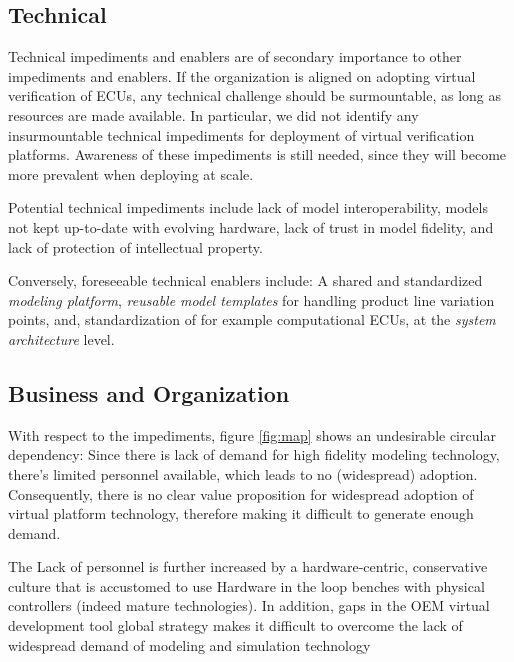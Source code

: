 \subsection{Technical}
Technical impediments and enablers are of secondary importance to other impediments and enablers.
If the organization is aligned on adopting virtual verification of ECUs,
any technical challenge should be surmountable, as long as resources are made available.
In particular, we did not identify any insurmountable technical impediments for deployment of virtual verification platforms.
Awareness of these impediments is still needed, since they will become more prevalent when deploying at scale.

Potential technical impediments include
lack of model interoperability,
models not kept up-to-date with evolving hardware,
lack of trust in model fidelity,
and lack of protection of intellectual property.

Conversely, foreseeable technical enablers include:
A shared and standardized \emph{modeling platform},
\emph{reusable model templates} for handling product line variation points,
and, standardization of for example computational ECUs, at the \emph{system architecture} level.



\subsection{Business and Organization}
With respect to the impediments, figure \ref{fig:map} shows an undesirable circular dependency: Since there is lack of demand for high fidelity modeling technology, there's limited personnel available, which leads to no (widespread) adoption. Consequently, there is no clear value proposition for widespread adoption of virtual platform technology, therefore making it difficult to generate enough demand.

The Lack of personnel is further increased by a hardware-centric, conservative culture that is accustomed to use Hardware in the loop benches with physical controllers (indeed mature technologies). In addition, gaps in the OEM virtual development tool global strategy makes it difficult to overcome the lack of widespread demand of modeling and simulation technology


